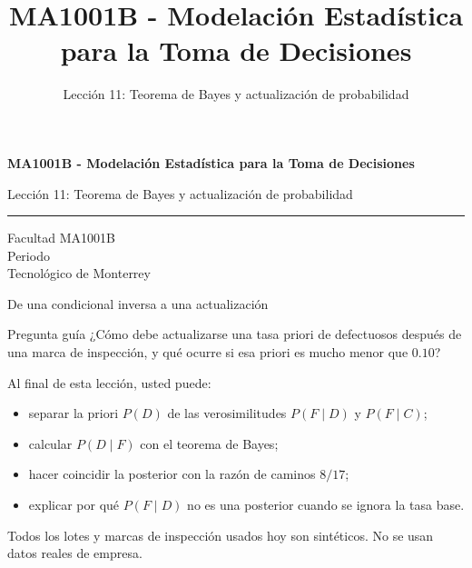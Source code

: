 \documentclass[aspectratio=169,10pt,spanish]{beamer}
\title{MA1001B - Modelación Estadística para la Toma de Decisiones}
\subtitle{Lección 11: Teorema de Bayes y actualización de probabilidad}
\author{}
\institute{Tecnol\'ogico de Monterrey}
\date{}
\begin{document}
\begin{frame}[plain]
  \vspace{1.2cm}
  {\Large\bfseries MA1001B - Modelación Estadística para la Toma de Decisiones\par}
  \vspace{0.7cm}
  {\large Lección 11: Teorema de Bayes y actualización de probabilidad\par}
  \vspace{0.7cm}
  {\color{TecRojo}\rule{\textwidth}{1.2pt}}
  \vspace{0.8cm}

  Facultad MA1001B\\[0.3cm]
  Periodo\\[0.3cm]
  Tecnol\'ogico de Monterrey
\end{frame}

\begin{frame}{De una condicional inversa a una actualización}
  \begin{alertblock}{Pregunta guía}
    ¿Cómo debe actualizarse una tasa priori de defectuosos después de una
    marca de inspección, y qué ocurre si esa priori es mucho menor que
    $0.10$?
  \end{alertblock}

  \vspace{0.6em}
  Al final de esta lección, usted puede:
  \begin{itemize}
    \item separar la priori $P(D)$ de las verosimilitudes $P(F\mid D)$ y $P(F\mid C)$;
    \item calcular $P(D\mid F)$ con el teorema de Bayes;
    \item hacer coincidir la posterior con la razón de caminos $8/17$;
    \item explicar por qué $P(F\mid D)$ no es una posterior cuando se ignora la
      tasa base.
  \end{itemize}

  \vfill
  \scriptsize Todos los lotes y marcas de inspección usados hoy son sintéticos. No se usan datos reales de empresa.
\end{frame}
\end{document}
